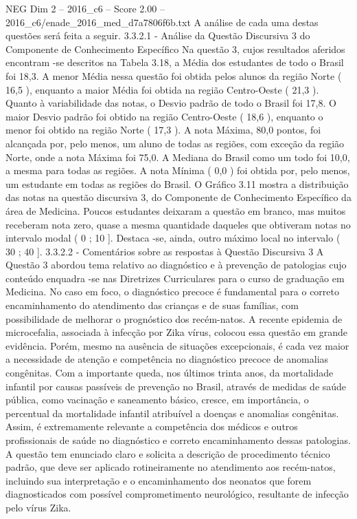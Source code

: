 \begin{textsample}{NEG Dim 2 – 2016\_c6 – Score 2.00 – 2016\_c6/enade\_2016\_med\_d7a7806f6b.txt}
A análise de cada uma destas questões será feita a seguir. 3.3.2.1 - Análise da Questão Discursiva 3 do Componente de Conhecimento Específico Na questão 3, cujos resultados aferidos encontram -se descritos na Tabela 3.18, a Média dos estudantes de todo o Brasil foi 18,3.
A menor Média nessa questão foi obtida pelos alunos da região Norte ( 16,5 ), enquanto a maior Média foi obtida na região Centro-Oeste ( 21,3 ).
Quanto à variabilidade das notas, o Desvio padrão de todo o Brasil foi 17,8.
O maior Desvio padrão foi obtido na região Centro-Oeste ( 18,6 ), enquanto o menor foi obtido na região Norte ( 17,3 ).
A nota Máxima, 80,0 pontos, foi alcançada por, pelo menos, um aluno de todas as regiões, com exceção da região Norte, onde a nota Máxima foi 75,0.
A Mediana do Brasil como um todo foi 10,0, a mesma para todas as regiões.
A nota Mínima ( 0,0 ) foi obtida por, pelo menos, um estudante em todas as regiões do Brasil.
O Gráfico 3.11 mostra a distribuição das notas na questão discursiva 3, do Componente de Conhecimento Específico da área de Medicina.
Poucos estudantes deixaram a questão em branco, mas muitos receberam nota zero, quase a mesma quantidade daqueles que obtiveram notas no intervalo modal ( 0 ; 10 ].
Destaca -se, ainda, outro máximo local no intervalo ( 30 ; 40 ]. 3.3.2.2 - Comentários sobre as respostas à Questão Discursiva 3 A Questão 3 abordou tema relativo ao diagnóstico e à prevenção de patologias cujo conteúdo enquadra -se nas Diretrizes Curriculares para o curso de graduação em Medicina.
No caso em foco, o diagnóstico precoce é fundamental para o correto encaminhamento do atendimento das crianças e de suas famílias, com possibilidade de melhorar o prognóstico dos recém-natos.
A recente epidemia de microcefalia, associada à infecção por Zika vírus, colocou essa questão em grande evidência.
Porém, mesmo na ausência de situações excepcionais, é cada vez maior a necessidade de atenção e competência no diagnóstico precoce de anomalias congênitas.
Com a importante queda, nos últimos trinta anos, da mortalidade infantil por causas passíveis de prevenção no Brasil, através de medidas de saúde pública, como vacinação e saneamento básico, cresce, em importância, o percentual da mortalidade infantil atribuível a doenças e anomalias congênitas.
Assim, é extremamente relevante a competência dos médicos e outros profissionais de saúde no diagnóstico e correto encaminhamento dessas patologias.
A questão tem enunciado claro e solicita a descrição de procedimento técnico padrão, que deve ser aplicado rotineiramente no atendimento aos recém-natos, incluindo sua interpretação e o encaminhamento dos neonatos que forem diagnosticados com possível comprometimento neurológico, resultante de infecção pelo vírus Zika.

\end{textsample}
